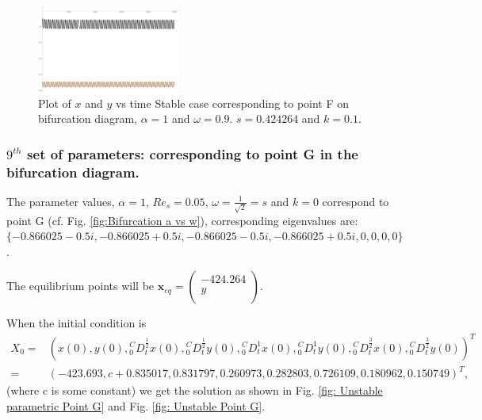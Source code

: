 \documentclass[pdflatex,sn-mathphys]{sn-jnl}%
\theoremstyle{thmstyleone}%
\theoremstyle{thmstyletwo}%
\theoremstyle{thmstylethree}%
\begin{document}
\begin{figure}[h]%
\centering
\includegraphics[width=0.42\textwidth]{ais1orbitplot}
    \caption{Plot of $x$ and $y$ vs time Stable case corresponding to point F on bifurcation diagram, $\alpha = 1$ and $\omega=0.9$. $s=0.424264$ and $k=0.1$.}
    \label{fig:Stable  Point F}
\end{figure}

\subsubsection{$9^{th}$ set of parameters: corresponding to point G in the bifurcation diagram.}\label{$9{th}$ set}
The parameter values, $\alpha = 1$, $Re_{s}=0.05$, $\omega=\frac{1}{\sqrt{2}}=s$ and $k=0$ correspond to point G (cf. Fig. \ref{fig:Bifurcation a vs w}), corresponding eigenvalues are: $\{-0.866025-0.5 i,-0.866025+0.5 i,-0.866025-0.5 i,-0.866025+0.5 i,0,0,0,0\}$.

The equilibrium points will be $\mathbf{x}_{eq}=
 \left(
\begin{array}{c}
-424.264 \\
y \\\end{array}
\right)$.

When the initial condition is \begin{align*}
X_{0}=&
\left(
x(0) ,
y(0) ,
{ }_{0}^{C}D_{t}^{\frac{1}{2}}x(0) ,
{ }_{0}^{C}D_{t}^{\frac{1}{2}}y(0) ,
{ }_{0}^{C}D_{t}^{1} x(0) ,
{ }_{0}^{C}D_{t}^{1}y(0) ,
{ }_{0}^{C}D_{t}^{\frac{3}{2}}x(0) ,
{ }_{0}^{C}D_{t}^{\frac{3}{2}}y(0)
\right)^T \\ =& \left(
 -423.693 ,
 c+0.835017 ,
 0.831797 ,
 0.260973 ,
 0.282803 ,
 0.726109 ,
 0.180962 ,
 0.150749 
\right)^T,
\end{align*}
(where c is some constant) we get the solution as shown in Fig.  \ref{fig: Unstable parametric Point G} and Fig. \ref{fig: Unstable  Point G}.
\end{document}
